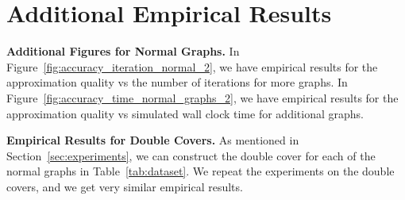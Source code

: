 \section{Additional Empirical Results}

\noindent \textbf{Additional Figures for Normal Graphs.}
In Figure~\ref{fig:accuracy_iteration_normal_2},
we have empirical results
for the approximation quality vs the number of iterations for more graphs.
In Figure~\ref{fig:accuracy_time_normal_graphs_2},
we have empirical results for the approximation
quality vs simulated wall clock time for additional graphs.


\noindent \textbf{Empirical Results for Double Covers.}
As mentioned in Section~\ref{sec:experiments},
we can construct the double cover for each
of the normal graphs in Table~\ref{tab:dataset}.
We repeat the experiments on the double covers, and we get
very similar empirical results.



